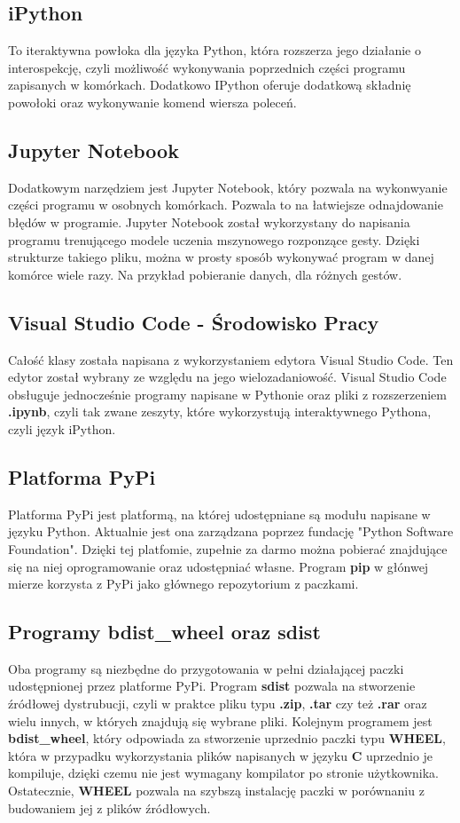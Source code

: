 \subsection{iPython}
\quad To iteraktywna powłoka dla języka Python, która rozszerza jego działanie o interospekcję, czyli możliwość wykonywania poprzednich części programu zapisanych w komórkach. Dodatkowo IPython oferuje dodatkową składnię powołoki oraz wykonywanie komend wiersza poleceń. 

\subsection{Jupyter Notebook}
\quad Dodatkowym narzędziem jest Jupyter Notebook, który pozwala na wykonwyanie części programu w osobnych komórkach. Pozwala to na łatwiejsze odnajdowanie błędów w programie.
\quad Jupyter Notebook został wykorzystany do napisania programu trenującego modele uczenia mszynowego rozponzące gesty. Dzięki strukturze takiego pliku, można w prosty sposób wykonywać program w danej komórce wiele razy. Na przykład pobieranie danych, dla różnych gestów. 

\subsection{Visual Studio Code - Środowisko Pracy}
\quad Całość klasy została napisana z wykorzystaniem edytora Visual Studio Code. Ten edytor został wybrany ze względu na jego wielozadaniowość. Visual Studio Code obsługuje jednocześnie programy napisane w Pythonie oraz pliki z rozszerzeniem \textbf{.ipynb}, czyli tak zwane zeszyty, które wykorzystują interaktywnego Pythona, czyli język iPython. 

\subsection{Platforma PyPi}
\quad Platforma PyPi jest platformą, na której udostępniane są modułu napisane w języku Python. Aktualnie jest ona zarządzana poprzez fundację "Python Software Foundation". Dzięki tej platfomie, zupełnie za darmo można pobierać znajdujące się na niej oprogramowanie oraz udostępniać własne. Program \textbf{pip} w głónwej mierze korzysta z PyPi jako głównego repozytorium z paczkami. 

\subsection{Programy bdist\_wheel oraz sdist}
\quad Oba programy są niezbędne do przygotowania w pełni działającej paczki udostępnionej przez platforme PyPi. Program \textbf{sdist} pozwala na stworzenie źródłowej dystrubucji, czyli w praktce pliku typu \textbf{.zip}, \textbf{.tar} czy też \textbf{.rar} oraz wielu innych, w których znajdują się wybrane pliki. 
\quad Kolejnym programem jest \textbf{bdist\_wheel}, który odpowiada za stworzenie uprzednio paczki typu \textbf{WHEEL}, która w przypadku wykorzystania plików napisanych w języku \textbf{C} uprzednio je kompiluje, dzięki czemu nie jest wymagany kompilator po stronie użytkownika. Ostatecznie, \textbf{WHEEL} pozwala na szybszą instalację paczki w porównaniu z budowaniem jej z plików źródłowych. 


